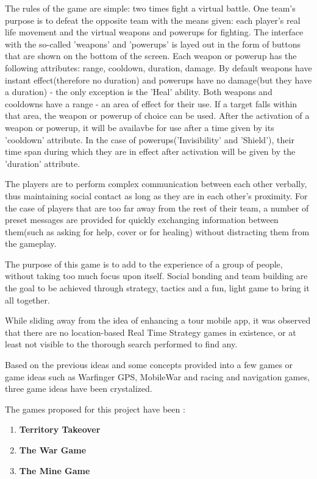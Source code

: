 The rules of the game are simple: two times fight a virtual battle. One team's
purpose is to defeat the opposite team with the means given: each player's real
life movement and the virtual weapons and powerups for fighting. The interface
with the so-called 'weapons' and 'powerups' is layed out in the form of buttons
that are shown on the bottom of the screen. Each weapon or powerup has the
following attributes: range, cooldown, duration, damage. By default weapons have
instant effect(therefore no duration) and powerups have no damage(but they have
a duration) - the only exception is the 'Heal' ability. Both weapons and
cooldowns have a range - an area of effect for their use. If a target falls
within that area, the weapon or powerup of choice can be used. After the
activation of a weapon or powerup, it will be availavbe for use after a time
given by its 'cooldown' attribute. In the case of powerups('Invisibility' and
'Shield'), their time span during which they are in effect after activation will
be given by the 'duration' attribute. \newline

The players are to perform complex communication between each other verbally,
thus maintaining social contact as long as they are in each other's proximity.
For the case of players that are too far away from the rest of their team, a
number of preset messages are provided for quickly exchanging information
between them(such as asking for help, cover or for healing) without distracting
them from the gameplay.\newline

The purpose of this game is to add to the experience of a group of people,
without taking too much focus upon itself. Social bonding and team building are
the goal to be achieved through strategy, tactics and a fun, light game to bring
it all together.\newline

While sliding away from the idea of enhancing a tour mobile app, it was observed
that there are no location-based Real Time Strategy games in existence, or at
least not visible to the thorough search performed to find any.\newline

Based on the previous ideas and some concepts provided into a few games or game
ideas such as Warfinger GPS, MobileWar and racing and navigation games, three
game ideas have been crystalized.\newline 

The games proposed for this project have been :
\begin{enumerate}	
	\item \textbf{Territory Takeover}
	\item \textbf{The War Game}
	\item \textbf{The Mine Game}
\end{enumerate}

